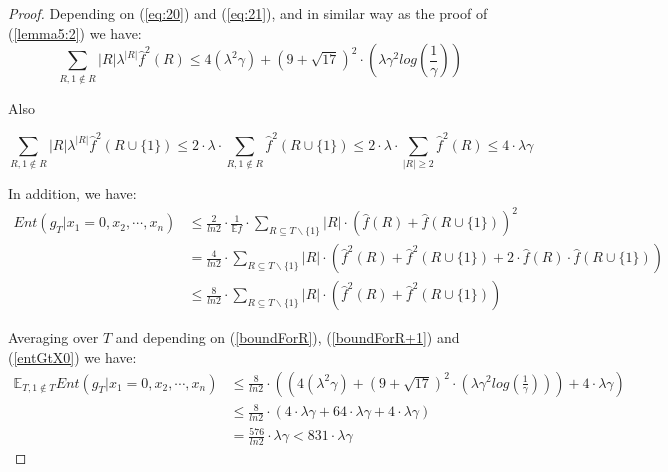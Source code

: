 \documentclass{article}
\begin{document}
			\begin{proof}
				Depending on (\ref{eq:20}) and (\ref{eq:21}), and in similar way as the proof of (\ref{lemma5:2}) we have:
				\begin{equation} \label{boundForR}
					\sum_{R, 1 \notin R} |R| \lambda^{|R|} \hat{f}^2(R) 
					\leq 4 ( \lambda^2 \gamma ) + \left( 9 + \sqrt{17} \right)^2 \cdot \left( \lambda \gamma^2 log \left( \frac{1}{\gamma} \right) \right)
				\end{equation}

				Also
				
				\begin{equation} \label{boundForR+1}
					\sum_{R, 1 \notin R} |R| \lambda^{|R|} \hat{f}^2(R \cup \{1\}) 
					\leq 2 \cdot \lambda \cdot \sum_{R, 1 \notin R} \hat{f}^2(R \cup \{1\})
					\leq 2 \cdot \lambda \cdot \sum_{|R| \geq 2} \hat{f}^2(R)
					\leq 4 \cdot \lambda \gamma
				\end{equation}
				
				In addition, we have:
				\begin{equation} \label{entGtX0} \begin{aligned}
					Ent \left( g_T | x_1 = 0,x_2, \cdots, x_n \right) 
					& \leq \frac{2}{ln 2} \cdot \frac{1}{\mathbb{E} f} \cdot \sum_{R \subseteq {T\backslash \{1\}}} |R| \cdot \left( \hat{f} (R) + \hat{f} (R \cup \{1\}) \right)^2 \\ 
					& = \frac{4}{ln 2} \cdot \sum_{R \subseteq {T\backslash \{1\}}} |R| \cdot \left( \hat{f}^2 (R) + \hat{f}^2 (R \cup \{1\}) + 2 \cdot \hat{f}(R)  \cdot \hat{f} (R \cup \{1\}) \right) \\ 
					& \leq \frac{8}{ln 2} \cdot \sum_{R \subseteq {T\backslash \{1\}}} |R| \cdot \left( \hat{f}^2 (R) + \hat{f}^2 (R \cup \{1\}) \right)
				\end{aligned}
				\end{equation}
				
				Averaging over $T$ and depending on (\ref{boundForR}), (\ref{boundForR+1}) and (\ref{entGtX0}) we have:
				\begin{equation} \label{final22} \begin{aligned}
					\mathbb{E}_{T, 1 \notin T} Ent \left( g_T | x_1 = 0,x_2, \cdots, x_n \right)
					& \leq \frac{8}{ln 2} \cdot \left( \left( 4 ( \lambda^2 \gamma ) + \left( 9 + \sqrt{17} \right)^2 \cdot \left( \lambda \gamma^2 log \left( \frac{1}{\gamma} \right) \right) \right)  + 4 \cdot \lambda \gamma \right) \\
					& \leq \frac{8}{ln 2} \cdot \left( 4 \cdot \lambda \gamma + 64 \cdot \lambda \gamma + 4 \cdot \lambda \gamma \right) \\
					& = \frac{576}{ln 2} \cdot \lambda \gamma < 831 \cdot \lambda \gamma
				\end{aligned}			
				\end{equation}
			\end{proof}
\end{document}
